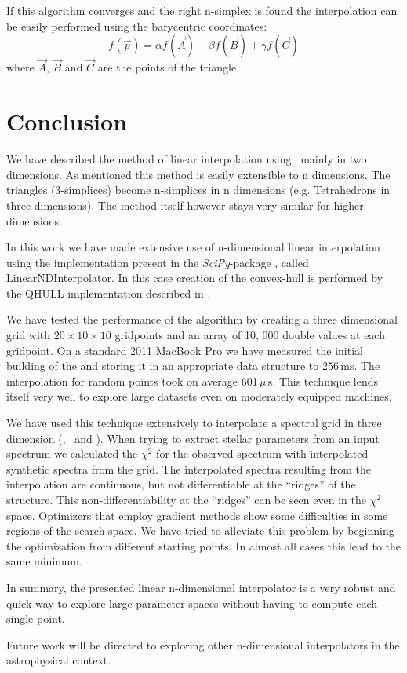 If this algorithm converges and the right n-simplex is found the interpolation can be easily performed using the barycentric coordinates:
\[
f(\vec{p})=\alpha f(\vec{A}) + \beta f(\vec{B}) + \gamma f(\vec{C})
\]
where  $\vec{A}$, $\vec{B}$ and $\vec{C}$ are the points of the triangle. 


\section{Conclusion}

We have described the method of linear interpolation using \deltri\ mainly in two dimensions. As mentioned this method is easily extensible to n dimensions. The triangles (3-simplices) become n-simplices in n dimensions (e.g. Tetrahedrons in three dimensions). The method itself however stays very similar for higher dimensions. 

In this work we have made extensive use of n-dimensional linear interpolation using the implementation present in the \textit{SciPy}-package \citescipy, called LinearNDInterpolator. In this case creation of the convex-hull is performed by the QHULL implementation described in \citet{Barber96thequickhull}.

We have tested the performance of the algorithm by creating a three dimensional grid with $20\times10\times10$ gridpoints and an array of 10, 000  double values at each gridpoint. 
On a standard 2011 MacBook Pro we have measured the initial building of the \deltri and storing it in an appropriate data structure to 256\,ms. The interpolation for random points took on average 601\,$\mu$\,s. This technique lends itself very well to explore large datasets even on moderately equipped machines. 

We have used this technique extensively to interpolate a spectral grid in three dimension (\teff, \logg\ and \feh). When trying to extract stellar parameters from an input spectrum we calculated the $\chi^2$ for the observed spectrum with interpolated synthetic spectra from the grid. The interpolated spectra resulting from the interpolation are continuous, but not differentiable at the ``ridges'' of the structure. This non-differentiability at the ``ridges'' can be seen even in the $\chi^2$ space. Optimizers that employ gradient methods \citep[such as MIGRAD][]{James:1975dr} show some difficulties in some regions of the search space. We have tried to alleviate this problem by beginning the optimization from different starting points. In almost all cases this lead to the same minimum.

In summary, the presented linear n-dimensional interpolator is a very robust and quick way to explore large parameter spaces without having to compute each single point. 

Future work will be directed to exploring other n-dimensional interpolators in the astrophysical context. 

